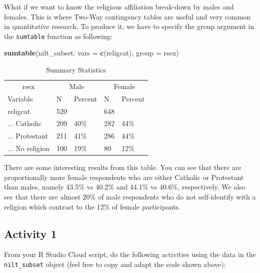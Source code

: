 \documentclass[
]{book}
\newenvironment{Shaded}{\begin{snugshade}}{\end{snugshade}}
\newcommand{\AttributeTok}[1]{\textcolor[rgb]{0.13,0.29,0.53}{#1}}
\newcommand{\FunctionTok}[1]{\textcolor[rgb]{0.13,0.29,0.53}{\textbf{#1}}}
\newcommand{\NormalTok}[1]{#1}
\newcommand{\StringTok}[1]{\textcolor[rgb]{0.31,0.60,0.02}{#1}}
\begin{document}
What if we want to know the religious affiliation break-down by males and females. This is where Two-Way contingency tables are useful and very common in quantitative research. To produce it, we have to specify the group argument in the \texttt{sumtable} function as following:

\begin{Shaded}
\begin{Highlighting}[]
\FunctionTok{sumtable}\NormalTok{(nilt\_subset, }\AttributeTok{vars =} \FunctionTok{c}\NormalTok{(}\StringTok{\textquotesingle{}religcat\textquotesingle{}}\NormalTok{), }\AttributeTok{group =} \StringTok{\textquotesingle{}rsex\textquotesingle{}}\NormalTok{)}
\end{Highlighting}
\end{Shaded}

\begin{table}

\caption{\label{tab:unnamed-chunk-52}Summary Statistics}
\centering
\begin{tabular}[t]{lllll}
\toprule
\multicolumn{1}{c}{rsex} & \multicolumn{2}{c}{Male} & \multicolumn{2}{c}{Female} \\
\cmidrule(l{3pt}r{3pt}){1-1} \cmidrule(l{3pt}r{3pt}){2-3} \cmidrule(l{3pt}r{3pt}){4-5}
Variable & N & Percent & N & Percent\\
\midrule
religcat & 520 &  & 648 & \\
... Catholic & 209 & 40\% & 282 & 44\%\\
... Protestant & 211 & 41\% & 286 & 44\%\\
... No religion & 100 & 19\% & 80 & 12\%\\
\bottomrule
\end{tabular}
\end{table}

There are some interesting results from this table. You can see that there are proportionally more female respondents who are either Catholic or Protestant than males, namely 43.5\% vs 40.2\% and 44.1\% vs 40.6\%, respectively. We also see that there are almost 20\% of male respondents who do not self-identify with a religion which contrast to the 12\% of female participants.

\hypertarget{activity-1-1}{%
\subsection{Activity 1}\label{activity-1-1}}

From your R Studio Cloud script, do the following activities using the data in the \texttt{nilt\_subset} object (feel free to copy and adapt the code shown above):
\end{document}
